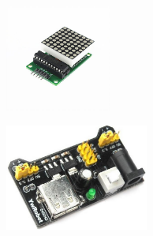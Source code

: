 \documentclass[12pt]{article}
\begin{document}
\begin{figure}[H]
\centering
\begin{minipage}{.4\textheight}
  \centering
  \includegraphics[height=3.5cm]{9.jpg}
  \label{fig:9}
\end{minipage}%
\begin{minipage}{.4\textheight}
  \centering
  \includegraphics[height=3.5cm]{10.jpg}
  \label{fig:10}
\end{minipage}
\end{figure}


\newpage


\nocite{*}
\end{document}
